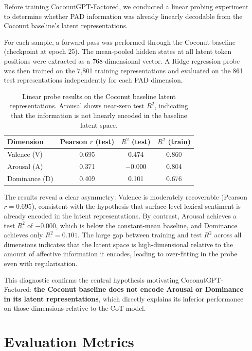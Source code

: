 \documentclass[12pt,twoside]{report}
\begin{document}
Before training CoconutGPT-Factored, we conducted a linear probing experiment to determine whether PAD information was already linearly decodable from the Coconut baseline's latent representations.

For each sample, a forward pass was performed through the Coconut baseline (checkpoint at epoch 25).
The mean-pooled hidden states at all latent token positions were extracted as a 768-dimensional vector.
A Ridge regression probe was then trained on the 7{,}801 training representations and evaluated on the 861 test representations independently for each PAD dimension.

\begin{table}[H]
\centering
\begin{tabular}{lccc}
\toprule
\textbf{Dimension} & \textbf{Pearson $r$ (test)} & \textbf{$R^2$ (test)} & \textbf{$R^2$ (train)} \\
\midrule
Valence (V)   & 0.695 & \phantom{$-$}0.474 & 0.860 \\
Arousal (A)   & 0.371 & $-$0.000 & 0.804 \\
Dominance (D) & 0.409 & \phantom{$-$}0.101 & 0.676 \\
\bottomrule
\end{tabular}
\caption{Linear probe results on the Coconut baseline latent representations. Arousal shows near-zero test $R^2$, indicating that the information is not linearly encoded in the baseline latent space.}
\label{tab:probe_baseline}
\end{table}

The results reveal a clear asymmetry: Valence is moderately recoverable (Pearson $r = 0.695$), consistent with the hypothesis that surface-level lexical sentiment is already encoded in the latent representations.
By contrast, Arousal achieves a test $R^2$ of $-0.000$, which is below the constant-mean baseline, and Dominance achieves only $R^2 = 0.101$.
The large gap between training and test $R^2$ across all dimensions indicates that the latent space is high-dimensional relative to the amount of affective information it encodes, leading to over-fitting in the probe even with regularisation.

This diagnostic confirms the central hypothesis motivating CoconutGPT-Factored: \textbf{the Coconut baseline does not encode Arousal or Dominance in its latent representations}, which directly explains its inferior performance on those dimensions relative to the CoT model.

\section{Evaluation Metrics}
\end{document}
